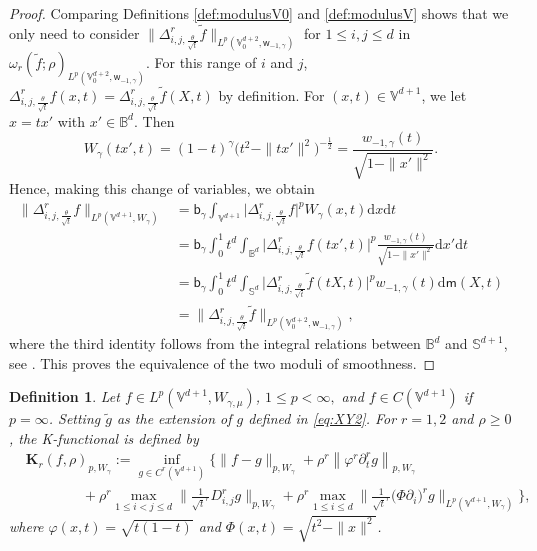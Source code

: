 \documentclass{amsart}
\newtheorem{defn}[thm]{Definition}
\theoremstyle{remark}
\def\d{\mathrm{d}}
\def\g{{\gamma}}
\def\t{{\theta}}
\def\o{{\omega}}
\def\Kb{{\mathbf K}}
\def\BB{{\mathbb B}}
\def\SS{{\mathbb S}}
\def\VV{{\mathbb V}}
\def\d{\mathrm{d}}
\def\sb{{\mathsf b}}
\def\sm{{\mathsf m}}
\def\sw{{\mathsf w}}
\def\g{{\gamma}}
\def\t{{\theta}}
\def\o{{\omega}}
\def\Kb{{\mathbf K}}
\def\BB{{\mathbb B}}
\def\SS{{\mathbb S}}
\def\VV{{\mathbb V}}
\newcommand{\wt}{\widetilde}
\def\f{\frac}
\def\f{\frac}
\begin{document}
\begin{proof}
Comparing Definitions \ref{def:modulusV0} and \ref{def:modulusV} shows that we only need to consider 
$\Big \|\Delta_{i,j,\f{\t}{\sqrt{t}}}^r \wt f\Big \|_{L^p(\VV_0^{d+2}, \sw_{-1,\g})}$ for $1\le i,j\le d$ in 
$\o_r (\wt f; \rho)_{L^p(\VV_0^{d+2}, \sw_{-1,\g})}$. For this range of $i$ and $j$, 
$\Delta_{i,j,\f{\t}{\sqrt{t}}}^r f(x,t) = \Delta_{i,j,\f{\t}{\sqrt{t}}}^r \wt f(X,t)$ by definition. 
For $(x,t) \in \VV^{d+1}$, we let $x = t x'$ with $x' \in \BB^d$. Then 
$$
   W_\g (t x', t) = (1-t)^\g \big(t^2 - \|t x' \|^2 \big)^{-\f12} = \frac{w_{-1,\g}(t)} {\sqrt{1-\|x'\|^2}}. 
$$ 
Hence, making this change of variables, we obtain
\begin{align*}
\Big \|\Delta_{i,j,\f{\t}{\sqrt{t}}}^r f\Big \|_{L^p(\VV^{d+1}, W_\g)} & = \sb_\g \int_{\VV^{d+1}}
    \Big | \Delta_{i,j,\f{\t}{\sqrt{t}}}^r f \Big|^p W_\g(x,t) \d x \d t\\
& = \sb_\g \int_0^1 t^d \int_{\BB^d} \Big | \Delta_{i,j,\f{\t}{\sqrt{t}}}^r f (t x',t) \Big|^p  \frac{w_{-1,\g}(t)} {\sqrt{1-\|x'\|^2}} \d x' \d t\\
& =  \sb_\g \int_0^1 t^d \int_{\SS^d} \Big | \Delta_{i,j,\f{\t}{\sqrt{t}}}^r \wt f (t X,t) \Big|^p  w_{-1,\g}(t)  \d\sm (X,t) \\
& =  \Big \|\Delta_{i,j,\f{\t}{\sqrt{t}}}^r \wt f\Big \|_{L^p(\VV_0^{d+2}, \sw_{-1,\g})}, 
\end{align*}
where the third identity follows from the integral relations between $\BB^d$ and $\SS^{d+1}$, see \cite[(A.5.4)]{DaiX}.  
This proves the equivalence of the two moduli of smoothness. 
\end{proof}

\begin{defn}\label{def:KfuncV} 
Let $f\in L^p(\VV^{d+1}, W_{\g,\mu})$, $1\leq p <  \infty,$ and $f\in C(\VV^{d+1})$
if $p=\infty$. Setting $\tilde{g}$ as the extension of $g$ defined in \eqref{eq:XY2}.
For   $r =1, 2$ and $\rho\geq 0$, the K-functional is defined by 
\begin{align*}
 & \Kb_r(f,\rho)_{p,W_{\g}} :=   \inf_{g \in C^r(\VV^{d+1})} 
	\bigg\{  \|f-g\|_{p,W_{\g}}  + \rho^r\left\|\varphi^{ r }\partial_t^rg  \right\|_{p,W_\g} \\ 
	& \qquad\qquad+ \rho^r \max_{1\leq i<j\leq d}   \Big \|\frac 1{\sqrt{t}^r}D_{i,j}^r g \Big \|_{p,W_{\g}}   
	+ \rho^r \max_{1\leq i \leq d} \Big \|\frac 1{\sqrt{t}^r} \big ( \Phi \partial_i \big)^r g \Big \|_{L^p(\VV^{d+1},W_\g)}  
\bigg\},
\end{align*}
where $\varphi(x,t) = \sqrt{t(1-t)}$ and $\Phi(x,t) = \sqrt{t^2 - \|x\|^2}$. 
\end{defn} 
\end{document}

